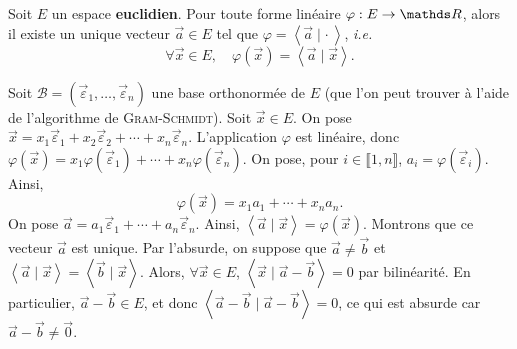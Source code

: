 \begin{thm}
	Soit $E$\/ un espace \textbf{euclidien}. Pour toute forme linéaire $\varphi : E \to \R$, alors il existe un unique vecteur $\vec{a} \in E$\/ tel que $\varphi = \left<\vec{a}  \mid \cdot \: \right>$, \textit{i.e.}\ \[
		\forall \vec{x} \in E,\quad \varphi(\vec{x}) = \left<\vec{a}  \mid \vec{x} \right>
	.\]
\end{thm}

\begin{prv}
	Soit $\mathcal{B} = (\vec{\varepsilon}_1,\ldots,\vec{\varepsilon}_n)$\/ une base orthonormée de $E$\/ (que l'on peut trouver à l'aide de l'algorithme de \textsc{Gram}-\textsc{Schmidt}).
	Soit $\vec{x} \in E$. On pose $\vec{x} = x_1 \vec{\varepsilon}_1 + x_2 \vec{\varepsilon}_2 + \cdots + x_n \vec{\varepsilon}_n$.
	L'application $\varphi$\/ est linéaire, donc $\varphi(\vec{x}) = x_1 \varphi(\vec{\varepsilon}_1) + \cdots + x_n \varphi(\vec{\varepsilon}_n)$. On pose, pour $i \in \llbracket 1,n \rrbracket$, $a_i = \varphi(\vec{\varepsilon}_i)$. Ainsi, \[
		\varphi(\vec{x}) = x_1 a_1 + \cdots + x_n a_n
	.\]
	On pose $\vec{a} = a_1 \vec{\varepsilon}_1 + \cdots + a_n \vec{\varepsilon}_n$. Ainsi, $\left<\vec{a} \mid \vec{x} \right> = \varphi(\vec{x})$. Montrons que ce vecteur $\vec{a}$\/ est unique. Par l'absurde, on suppose que $\vec{a} \neq \vec{b}$\/ et $\left<\vec{a}  \mid \vec{x} \right> = \left<\vec{b}  \mid \vec{x} \right>$. Alors, $\forall \vec{x} \in E$, $\left<\vec{x}  \mid \vec{a} - \vec{b} \right> = 0$\/ par bilinéarité. En particulier, $\vec{a} - \vec{b} \in E$, et donc $\left<\vec{a} - \vec{b}  \mid \vec{a} - \vec{b} \right> = 0$, ce qui est absurde car $\vec{a} - \vec{b} \neq \vec{0}$.
\end{prv}

